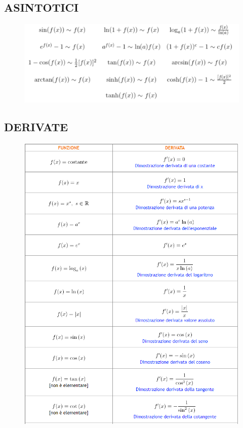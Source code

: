 \documentclass[a4paper, 9pt]{report}
\begin{document}
\subsection*{ASINTOTICI}
\begin{figure}[h!]
    \includegraphics[width=\linewidth]{../dim/asintotici.PNG}
\end{figure}
\newpage
\subsection*{DERIVATE}
\begin{figure}[h!]
    \includegraphics[width=\linewidth]{../dim/derivate1.PNG}
\end{figure}
\end{document}
